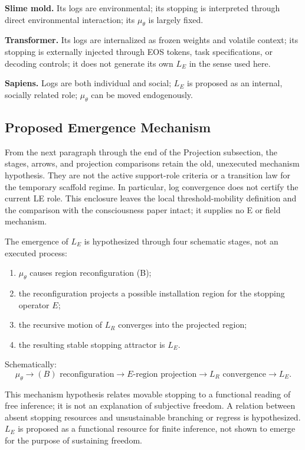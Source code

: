 \textbf{Slime mold.} Its logs are environmental; its stopping is interpreted through direct environmental interaction; its $\mu_\theta$ is largely fixed.

\textbf{Transformer.} Its logs are internalized as frozen weights and volatile context; its stopping is externally injected through EOS tokens, task specifications, or decoding controls; it does not generate its own $L_E$ in the sense used here.

\textbf{Sapiens.} Logs are both individual and social; $L_E$ is proposed as an internal, socially related role; $\mu_\theta$ can be moved endogenously.

\subsection{Proposed Emergence Mechanism}

From the next paragraph through the end of the Projection subsection, the stages, arrows, and projection comparisons retain the old, unexecuted mechanism hypothesis. They are not the active support-role criteria or a transition law for the temporary scaffold regime. In particular, log convergence does not certify the current LE role. This enclosure leaves the local threshold-mobility definition and the comparison with the consciousness paper intact; it supplies no E or field mechanism.

The emergence of $L_E$ is hypothesized through four schematic stages, not an executed process:
\begin{enumerate}
\item $\mu_\theta$ causes region reconfiguration (B);
\item the reconfiguration projects a possible installation region for the stopping operator $E$;
\item the recursive motion of $L_R$ converges into the projected region;
\item the resulting stable stopping attractor is $L_E$.
\end{enumerate}

Schematically:
\[
\mu_\theta \to (B)\text{ reconfiguration} \to E\text{-region projection} \to L_R\text{ convergence} \to L_E .
\]

This mechanism hypothesis relates movable stopping to a functional reading of free inference; it is not an explanation of subjective freedom. A relation between absent stopping resources and unsustainable branching or regress is hypothesized. $L_E$ is proposed as a functional resource for finite inference, not shown to emerge for the purpose of sustaining freedom.

